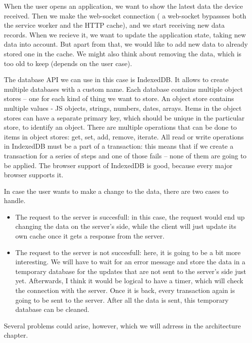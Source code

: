 When the user opens an application, we want to show the latest data the device received. Then we make the web-socket connection ( a web-socket bypassses both the service worker and the HTTP cache), and we start receiving new data records. When we recieve it, we want to update the application state, taking new data into account. But apart from that, we would like to add new data to already stored one in the cache. We might also think about removing the data, which is too old to keep (depends on the user case). 

The database API we can use in this case is IndexedDB. It allows to create multiple databases with a custom name. Each database contains multiple object stores -- one for each kind of thing we want to store. An object store contains multiple values - JS objects, strings, numbers, dates, arrays. Items in the object stores can have a separate primary key, which should be unique in the particular store, to identify an object. There are multiple operations that can be done to items in object stores: get, set, add, remove, iterate. All read or write operations in IndexedDB must be a part of a transaction: this means that if we create a transaction for a series of steps and one of those fails -- none of them are going to be applied. The browser support of IndexedDB is good, because every major browser supports it. 

In case the user wants to make a change to the data, there are two cases to handle. 

\begin{itemize}
\item{The request to the server is succesfull: in this case, the request would end up changing the data on the server's side, while the client will just update its own cache once it gets a response from the server.}
\item{The request to the server is not succesfull: here, it is going to be a bit more interesting. We will have to wait for an error message and store the data in a temporary database for the updates that are not sent to the server's side just yet. Afterwards, I think it would be logical to have a timer, which will check the connection with the server. Once it is back, every transaction again is going to be sent to the server. After all the data is sent, this temporary database can be cleaned. }

\end{itemize}

Several problems could arise, however, which we will adrress in the architecture chapter.